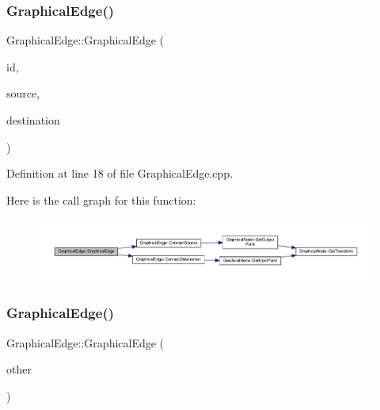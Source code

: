 \subsubsection{\texorpdfstring{Graphical\+Edge()}{GraphicalEdge()}\hspace{0.1cm}{\footnotesize\ttfamily [3/4]}}
{\footnotesize\ttfamily Graphical\+Edge\+::\+Graphical\+Edge (\begin{DoxyParamCaption}\item[{\hyperlink{_graphical_element_8h_ade5fd6c85839a416577ff9de1605141e}{Element\+Key}}]{id,  }\item[{\hyperlink{class_graphical_node}{Graphical\+Node} $\ast$}]{source,  }\item[{\hyperlink{class_graphical_node}{Graphical\+Node} $\ast$}]{destination }\end{DoxyParamCaption})}



Definition at line 18 of file Graphical\+Edge.\+cpp.

Here is the call graph for this function\+:
\nopagebreak
\begin{figure}[H]
\begin{center}
\leavevmode
\includegraphics[width=350pt]{class_graphical_edge_af8c31162129b7c33427de769beaed38d_cgraph}
\end{center}
\end{figure}
\mbox{\label{class_graphical_edge_a50ac3c64f7c8d259d5905802a1808aa6}} 
\subsubsection{\texorpdfstring{Graphical\+Edge()}{GraphicalEdge()}\hspace{0.1cm}{\footnotesize\ttfamily [4/4]}}
{\footnotesize\ttfamily Graphical\+Edge\+::\+Graphical\+Edge (\begin{DoxyParamCaption}\item[{const \hyperlink{class_graphical_edge}{Graphical\+Edge} \&}]{other }\end{DoxyParamCaption})}



